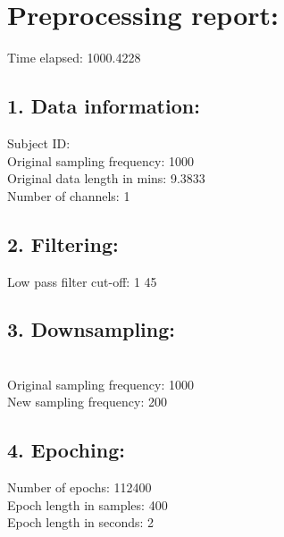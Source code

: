 \documentclass[10pt,a4paper,oneside]{report}
\begin{document}
\author{Veronika Shamova}
\date{\taday}
\section*{Preprocessing report:}
Time elapsed:  1000.4228\\ 
\subsection*{1. Data information:}
Subject ID: 
\\ Original sampling frequency: 1000 
\\ Original data length in mins: 9.3833 
\\ Number of channels: 1 
\subsection*{2. Filtering:}
Low pass filter cut-off: 1  45
\subsection*{3. Downsampling:}
\\ Original sampling frequency: 1000
\\ New sampling frequency: 200
\subsection*{4. Epoching:}
Number of epochs: 112400 
\\ Epoch length in samples: 400 
\\ Epoch length in seconds: 2 
\end{document}
